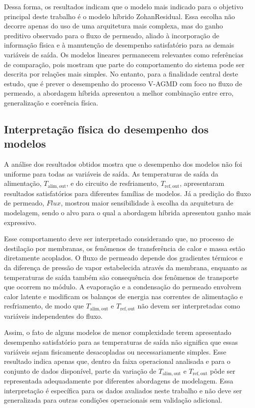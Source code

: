 Dessa forma, os resultados indicam que o modelo mais indicado para o objetivo principal deste trabalho é o modelo híbrido ZohanResidual. Essa escolha não decorre apenas do uso de uma arquitetura mais complexa, mas do ganho preditivo observado para o fluxo de permeado, aliado à incorporação de informação física e à manutenção de desempenho satisfatório para as demais variáveis de saída. Os modelos lineares permanecem relevantes como referências de comparação, pois mostram que parte do comportamento do sistema pode ser descrita por relações mais simples. No entanto, para a finalidade central deste estudo, que é prever o desempenho do processo V-AGMD com foco no fluxo de permeado, a abordagem híbrida apresentou a melhor combinação entre erro, generalização e coerência física.
\subsection{Interpretação física do desempenho dos modelos}
\label{subsec:interpretacao_fisica_modelos}

A análise dos resultados obtidos mostra que o desempenho dos modelos não foi uniforme para todas as variáveis de saída. As temperaturas de saída da alimentação, $T_{\mathrm{alim,out}}$, e do circuito de resfriamento, $T_{\mathrm{ref,out}}$, apresentaram resultados satisfatórios para diferentes famílias de modelos. Já a predição do fluxo de permeado, $Flux$, mostrou maior sensibilidade à escolha da arquitetura de modelagem, sendo o alvo para o qual a abordagem híbrida apresentou ganho mais expressivo.

Esse comportamento deve ser interpretado considerando que, no processo de destilação por membranas, os fenômenos de transferência de calor e massa estão diretamente acoplados. O fluxo de permeado depende dos gradientes térmicos e da diferença de pressão de vapor estabelecida através da membrana, enquanto as temperaturas de saída também são consequência dos fenômenos de transporte que ocorrem no módulo. A evaporação e a condensação do permeado envolvem calor latente e modificam os balanços de energia nas correntes de alimentação e resfriamento, de modo que $T_{\mathrm{alim,out}}$ e $T_{\mathrm{ref,out}}$ não devem ser interpretadas como variáveis independentes do fluxo.

Assim, o fato de alguns modelos de menor complexidade terem apresentado desempenho satisfatório para as temperaturas de saída não significa que essas variáveis sejam fisicamente desacopladas ou necessariamente simples. Esse resultado indica apenas que, dentro da faixa operacional analisada e para o conjunto de dados disponível, parte da variação de $T_{\mathrm{alim,out}}$ e $T_{\mathrm{ref,out}}$ pôde ser representada adequadamente por diferentes abordagens de modelagem. Essa interpretação é específica para os dados avaliados neste trabalho e não deve ser generalizada para outras condições operacionais sem validação adicional.

